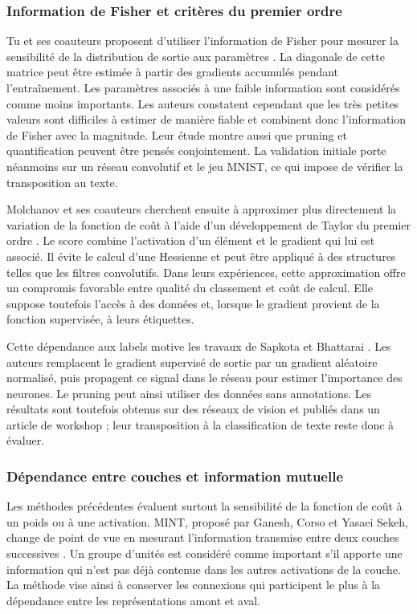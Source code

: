 \subsubsection{Information de Fisher et critères du premier ordre}

Tu et ses coauteurs proposent d'utiliser l'information de Fisher pour mesurer
la sensibilité de la distribution de sortie aux paramètres
\cite{tu2016fisher}. La diagonale de cette matrice peut être estimée à partir des
gradients accumulés pendant l'entraînement. Les paramètres associés à une faible
information sont considérés comme moins importants. Les auteurs constatent
cependant que les très petites valeurs sont difficiles à estimer de manière
fiable et combinent donc l'information de Fisher avec la magnitude. Leur étude
montre aussi que pruning et quantification peuvent être pensés conjointement.
La validation initiale porte néanmoins sur un réseau convolutif et le jeu MNIST,
ce qui impose de vérifier la transposition au texte.

Molchanov et ses coauteurs cherchent ensuite à approximer plus directement la
variation de la fonction de coût à l'aide d'un développement de Taylor du
premier ordre \cite{molchanov2017pruning}. Le score combine l'activation d'un
élément et le gradient qui lui est associé. Il évite le calcul d'une Hessienne
et peut être appliqué à des structures telles que les filtres convolutifs. Dans
leurs expériences, cette approximation offre un compromis favorable entre
qualité du classement et coût de calcul. Elle suppose toutefois l'accès à des
données et, lorsque le gradient provient de la fonction supervisée, à leurs
étiquettes.

Cette dépendance aux labels motive les travaux de Sapkota et Bhattarai
\cite{sapkota2023random}. Les auteurs remplacent le gradient supervisé de
sortie par un gradient aléatoire normalisé, puis propagent ce signal dans le
réseau pour estimer l'importance des neurones. Le pruning peut ainsi utiliser
des données sans annotations. Les résultats sont toutefois obtenus sur des
réseaux de vision et publiés dans un article de workshop ; leur transposition à
la classification de texte reste donc à évaluer.

\subsubsection{Dépendance entre couches et information mutuelle}

Les méthodes précédentes évaluent surtout la sensibilité de la fonction de coût
à un poids ou à une activation. MINT, proposé par Ganesh, Corso et Yasaei Sekeh,
change de point de vue en mesurant l'information transmise entre deux couches
successives \cite{ganesh2020mint}. Un groupe d'unités est considéré comme
important s'il apporte une information qui n'est pas déjà contenue dans les
autres activations de la couche. La méthode vise ainsi à conserver les
connexions qui participent le plus à la dépendance entre les représentations
amont et aval.

